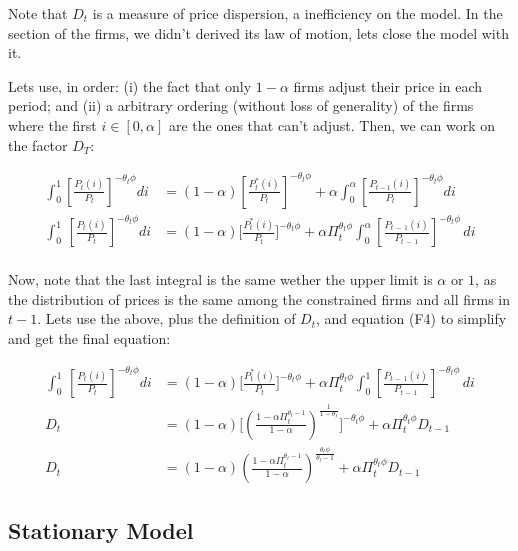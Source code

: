\documentclass[12pt]{article}
\begin{document}
Note that $D_t$ is a measure of price dispersion, a inefficiency on the model. In the section of the firms, we didn't derived its law of motion, lets close the model with it.

Lets use, in order: (i) the fact that only $1-\alpha$ firms adjust their price in each period; and (ii) a arbitrary ordering (without loss of generality) of the firms where the first $i \in [0,\alpha]$ are the ones that can't adjust. Then, we can work on the factor $D_T$:

\begin{align*}
    \int_{0}^{1}\left[{\frac{P_{t}(i)}{P_{t}}}\right]^{-\theta_{t}\phi}d i &=(1-\alpha)\left[{\frac{P_{t}^{*}(i)}{P_{t}}}\right]^{-\theta_{t}\phi}+\alpha\int_{0}^{\alpha}\left[{\frac{P_{t-1}(i)}{P_{t}}}\right]^{-\theta_{t}\phi}d i\\
    \int_{0}^{1}\,\left[\frac{P_{t}(i)}{P_{t}}\right]^{-\theta_{t}\phi}\!d i &=(1-\alpha)\biggl[\frac{P_{t}^{*}(i)}{P_{t}}\biggr]^{-\theta_{t}\phi}+\alpha \Pi_{t}^{\theta_{t}\phi}\int_{0}^{\alpha}\left[\frac{P_{t\,-\,1}(i)}{P_{t\,-\,1}}\right]^{-\theta_{t}\phi}\,d i\\
\end{align*}

Now, note that the last integral is the same wether the upper limit is $\alpha$ or $1$, as the distribution of prices is the same among the constrained firms and all firms in $t-1$.
Lets use the above, plus the definition of $D_t$, and equation (F4) to simplify and get the final equation:

\begin{align*}
    \int_{0}^{1}\,\left[\frac{P_{t}(i)}{P_{t}}\right]^{-\theta_{t}\phi}\!d i &=(1-\alpha)\biggl[\frac{P_{t}^{*}(i)}{P_{t}}\biggr]^{-\theta_{t}\phi}+\alpha \Pi_{t}^{\theta_{t}\phi}\int_{0}^{1}\left[\frac{P_{t\,-\,1}(i)}{P_{t\,-\,1}}\right]^{-\theta_{t}\phi}\,d i\\
    D_t &= (1-\alpha)\biggl[\left(\frac{1 - \alpha\Pi_t^{\theta_t-1}}{1-\alpha}\right)^{\frac{1}{1-\theta_t}}\biggr]^{-\theta_{t}\phi} + \alpha \Pi_{t}^{\theta_{t}\phi}D_{t-1}\\
    D_t &= (1-\alpha)\left(\frac{1 - \alpha\Pi_t^{\theta_t-1}}{1-\alpha}\right)^{\frac{\theta_t\phi}{\theta_t-1}} + \alpha \Pi_{t}^{\theta_{t}\phi}D_{t-1} \tag{26}
\end{align*}


\subsection{Stationary Model}
\end{document}
